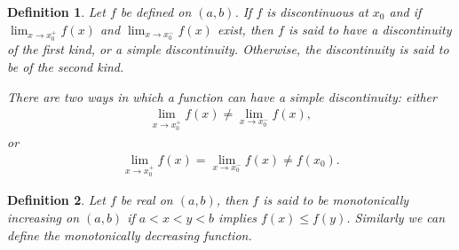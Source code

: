 \documentclass[11pt]{book}
\newtheorem{definition}{Definition}[chapter]
\theoremstyle{definition}
\numberwithin{equation}{chapter}
\begin{document}
\medskip

\begin{definition}\label{def_36}
Let $f$ be defined on $(a,b)$. If $f$ is discontinuous at $x_0$ and if $\lim_{x \to x_0^+} f(x)$ and $\lim_{x \to x_0^-} f(x)$ exist, then $f$ is said to have a discontinuity of the first kind, or a simple discontinuity. Otherwise, the discontinuity is said to be of the second kind.

There are two ways in which a function can have a simple discontinuity: either 
\begin{align*}
    \lim_{x \to x_0^+} f(x) \neq \lim_{x \to x_0^-} f(x),
\end{align*}
or
\begin{align*}
    \lim_{x \to x_0^+} f(x) = \lim_{x \to x_0^-} f(x) \neq f(x_0).
\end{align*}
\end{definition}

\medskip

\begin{definition}
Let $f$ be real on $(a,b)$, then $f$ is said to be monotonically increasing on $(a,b)$ if $a < x < y < b$ implies $f(x) \leq f(y)$. Similarly we can define the monotonically decreasing function.
\end{definition}

\medskip
\end{document}
